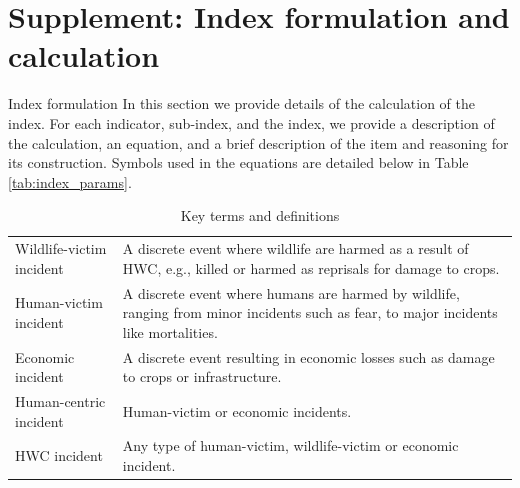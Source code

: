 \documentclass[fleqn,10pt]{olplainarticle}
\begin{document}

%        
%

\clearpage
\appendix
\renewcommand\thefigure{S\arabic{figure}}
\renewcommand\thetable{S\arabic{table}}
\renewcommand\theequation{S\arabic{equation}}
\setcounter{figure}{0}
\setcounter{table}{0}

\section*{Supplement: Index formulation and calculation}
\label{S1}
Index formulation
In this section we provide details of the calculation of the index. For each indicator, sub-index, and the index, we provide a description of the calculation, an equation, and a brief description of the item and reasoning for its construction. Symbols used in the equations are detailed below in Table \ref{tab:index_params}.


\begin{table}[ht!]
    \centering
    \caption{Key terms and definitions}
    \label{tab:definitions}
    \begin{tabular}{
    >{\raggedright\arraybackslash}p{3.5cm}
    p{10cm}
    }
         Wildlife-victim incident & A discrete event where wildlife are harmed as a result of HWC, e.g., killed or harmed as reprisals for damage to crops.\\
         Human-victim incident & A discrete event where humans are harmed by wildlife, ranging from minor incidents such as fear, to major incidents like mortalities.\\
         Economic incident & A discrete event resulting in economic losses such as damage to crops or infrastructure.\\
         Human-centric incident & Human-victim or economic incidents.\\
         HWC incident & Any type of human-victim, wildlife-victim or economic incident.\\
         
    \end{tabular}
\end{table}
\end{document}
